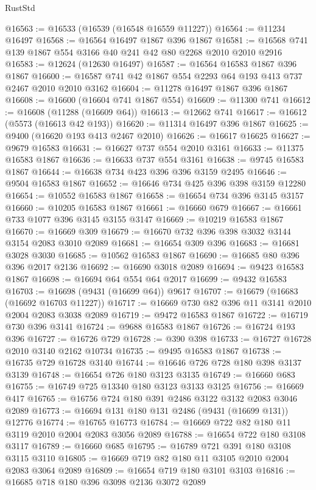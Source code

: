 \begin{lexlean}{RustStd}
\begin{coremodule}
@16563 := @16533 (@16539 (@16548 @16559 @11227))
@16564 := @11234 @16497
@16568 := @16564 @16497 @1867 @396 @1867
@16581 := @16568 @741 @139 @1867 @554 @3166 @40 @241 @42 @80 @2268 @2010 @2010 @2916
@16583 := @12624 (@12630 @16497)
@16587 := @16564 @16583 @1867 @396 @1867
@16600 := @16587 @741 @42 @1867 @554 @2293 @64 @193 @413 @737 @2467 @2010 @2010 @3162
@16604 := @11278 @16497 @1867 @396 @1867
@16608 := @16600 (@16604 @741 @1867 @554)
@16609 := @11300 @741
@16612 := @16608 (@11288 (@16609 @64))
@16613 := @12662 @741
@16617 := @16612 (@5573 (@16613 @42 @193))
@16620 := @11314 @16497 @396 @1867
@16625 := @9400 (@16620 @193 @413 @2467 @2010)
@16626 := @16617 @16625
@16627 := @9679 @16583
@16631 := @16627 @737 @554 @2010 @3161
@16633 := @11375 @16583 @1867
@16636 := @16633 @737 @554 @3161
@16638 := @9745 @16583 @1867
@16644 := @16638 @734 @423 @396 @396 @3159 @2495
@16646 := @9504 @16583 @1867
@16652 := @16646 @734 @425 @396 @398 @3159 @12280
@16654 := @10552 @16583 @1867
@16658 := @16654 @734 @396 @3145 @3157
@16660 := @10205 @16583 @1867
@16661 := @16660 @679
@16667 := @16661 @733 @1077 @396 @3145 @3155 @3147
@16669 := @10219 @16583 @1867
@16670 := @16669 @309
@16679 := @16670 @732 @396 @398 @3032 @3144 @3154 @2083 @3010 @2089
@16681 := @16654 @309 @396
@16683 := @16681 @3028 @3030
@16685 := @10562 @16583 @1867
@16690 := @16685 @80 @396 @396 @2017 @2136
@16692 := @16690 @3018 @2089
@16694 := @9423 @16583 @1867
@16698 := @16694 @64 @554 @64 @2017
@16699 := @9432 @16583
@16703 := @16698 (@9431 (@16699 @64)) @9617
@16707 := @16679 (@16683 (@16692 @16703 @11227))
@16717 := @16669 @730 @82 @396 @11 @3141 @2010 @2004 @2083 @3038 @2089
@16719 := @9472 @16583 @1867
@16722 := @16719 @730 @396 @3141
@16724 := @9688 @16583 @1867
@16726 := @16724 @193 @396
@16727 := @16726 @729
@16728 := @390 @398
@16733 := @16727 @16728 @2010 @3140 @2162 @10734
@16735 := @9495 @16583 @1867
@16738 := @16735 @729 @16728 @3140
@16744 := @16646 @726 @728 @180 @398 @3137 @3139
@16748 := @16654 @726 @180 @3123 @3135
@16749 := @16660 @683
@16755 := @16749 @725 @13340 @180 @3123 @3133 @3125
@16756 := @16669 @417
@16765 := @16756 @724 @180 @391 @2486 @3122 @3132 @2083 @3046 @2089
@16773 := @16694 @131 @180 @131 @2486 (@9431 (@16699 @131)) @12776
@16774 := @16765 @16773
@16784 := @16669 @722 @82 @180 @11 @3119 @2010 @2004 @2083 @3056 @2089
@16788 := @16654 @722 @180 @3108 @3117
@16789 := @16660 @685
@16795 := @16789 @721 @391 @180 @3108 @3115 @3110
@16805 := @16669 @719 @82 @180 @11 @3105 @2010 @2004 @2083 @3064 @2089
@16809 := @16654 @719 @180 @3101 @3103
@16816 := @16685 @718 @180 @396 @3098 @2136 @3072 @2089

\end{coremodule}
\end{lexlean}
